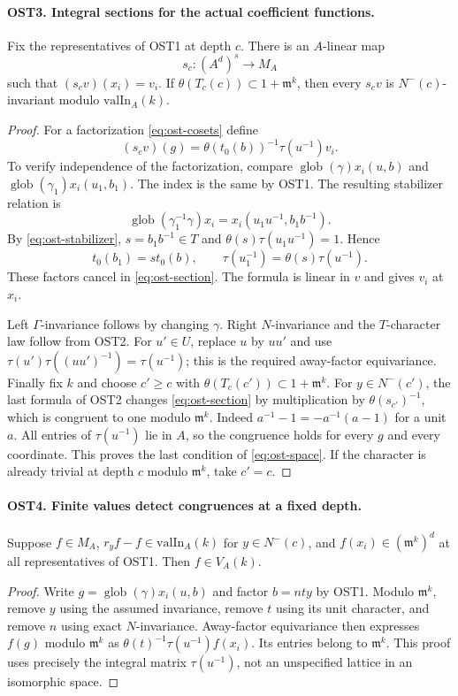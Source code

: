 \paragraph{OST3. Integral sections for the actual coefficient functions.}
\label{claim:OST3}
Fix the representatives of OST1 at depth $c$.  There is an
$A$-linear map
\[
 s_c:(A^d)^s\longrightarrow M_A
\]
such that $(s_c v)(x_i)=v_i$.  If
$\theta(T_c(c))\subset1+\mathfrak m^k$, then every $s_cv$ is
$N^-(c)$-invariant modulo $\mathrm{valIn}_A(k)$.
\begin{proof}
For a factorization \eqref{eq:ost-cosets} define
\begin{equation}\label{eq:ost-section}
 (s_cv)(g)=\theta(t_0(b))^{-1}\tau(u^{-1})v_i.
\end{equation}
To verify independence of the factorization, compare
$\operatorname{glob}(\gamma)x_i(u,b)$ and
$\operatorname{glob}(\gamma_1)x_i(u_1,b_1)$.  The index is the
same by OST1.  The resulting stabilizer relation is
\[
 \operatorname{glob}(\gamma_1^{-1}\gamma)x_i
       =x_i(u_1u^{-1},b_1b^{-1}).
\]
By \eqref{eq:ost-stabilizer}, $s=b_1b^{-1}\in T$ and
$\theta(s)\tau(u_1u^{-1})=1$.  Hence
\[
 t_0(b_1)=s t_0(b),\qquad
 \tau(u_1^{-1})=\theta(s)\tau(u^{-1}).
\]
These factors cancel in \eqref{eq:ost-section}.  The formula is
linear in $v$ and gives $v_i$ at $x_i$.

Left $\Gamma$-invariance follows by changing $\gamma$.
Right $N$-invariance and the $T$-character law follow from OST2.
For $u'\in U$, replace $u$ by $uu'$ and use
$\tau(u')\tau((uu')^{-1})=\tau(u^{-1})$; this is the required
away-factor equivariance.  Finally fix $k$ and choose
$c'\geq c$ with $\theta(T_c(c'))\subset1+\mathfrak m^k$.
For $y\in N^-(c')$, the last formula of OST2 changes
\eqref{eq:ost-section} by multiplication by
$\theta(s_{c'})^{-1}$, which is congruent to one modulo
$\mathfrak m^k$.  Indeed $a^{-1}-1=-a^{-1}(a-1)$ for a unit
$a$.  All entries of $\tau(u^{-1})$ lie in $A$, so the
congruence holds for every $g$ and every coordinate.  This proves
the last condition of \eqref{eq:ost-space}.  If the character is
already trivial at depth $c$ modulo $\mathfrak m^k$, take $c'=c$.
\end{proof}

\paragraph{OST4. Finite values detect congruences at a fixed depth.}
\label{claim:OST4}
Suppose $f\in M_A$, $r_yf-f\in\mathrm{valIn}_A(k)$ for
$y\in N^-(c)$, and $f(x_i)\in(\mathfrak m^k)^d$ at all
representatives of OST1.  Then $f\in V_A(k)$.
\begin{proof}
Write $g=\operatorname{glob}(\gamma)x_i(u,b)$ and factor
$b=nty$ by OST1.  Modulo $\mathfrak m^k$, remove $y$ using
the assumed invariance, remove $t$ using its unit character,
and remove $n$ using exact $N$-invariance.  Away-factor
equivariance then expresses $f(g)$ modulo $\mathfrak m^k$ as
$\theta(t)^{-1}\tau(u^{-1})f(x_i)$.  Its entries belong to
$\mathfrak m^k$.  This proof uses precisely the integral matrix
$\tau(u^{-1})$, not an unspecified lattice in an isomorphic space.
\end{proof}

